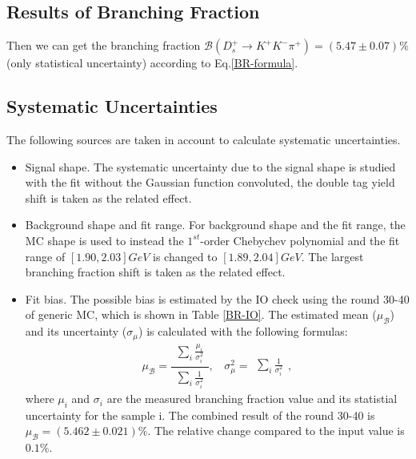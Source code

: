 {    \subsection{Results of Branching Fraction}



    Then we can get the branching fraction $\mathcal{B}(D_{s}^{+} \rightarrow K^{+}K^{-}\pi^{+})=(5.47\pm0.07)\%$(only statistical uncertainty) according to Eq.\ref{BR-formula}.

    \subsection{Systematic Uncertainties}
    The following sources are taken in account to calculate systematic uncertainties.

    \begin{itemize}
        \item Signal shape. The systematic uncertainty due to the signal shape is studied with the fit without the Gaussian function convoluted, the double tag yield shift is taken as the related effect. 

        \item Background shape and fit range. For background shape and the fit range, the MC shape is used to instead the $1^{st}$-order Chebychev polynomial and the fit range of $[1.90, 2.03]GeV$ is changed to $[1.89, 2.04]GeV$. 
            The largest branching fraction shift is taken as the related effect.
        
        \item Fit bias. The possible bias is estimated by the IO check using the round 30-40 of generic MC, which is shown in Table \ref{BR-IO}. 
            The estimated mean ($\mu_{\mathcal{B}}$) and its uncertainty ($\sigma_{\mu}$) is calculated with the following formulas:
            \begin{equation}
            \mu_{\mathcal{B}} = \frac{\begin{matrix}\sum_{i}\frac{\mu_{i}}{\sigma_{i}^{2}}\end{matrix}}{\begin{matrix}\sum_{i}\frac{1}{\sigma_{i}^{2}}\end{matrix}}, \ \ \ \ \sigma_{\mu}^{2}=\begin{matrix}\sum_{i}\frac{1}{\sigma_{i}^{2}}\end{matrix},
            \label{BR-Combined}
            \end{equation}
            where $\mu_{i}$ and $\sigma_{i}$ are the measured branching fraction value and its statistial uncertainty for the sample i. The combined result of the round 30-40 is $\mu_{\mathcal{B}} = (5.462 \pm 0.021)\%$. 
            The relative change compared to the input value is $0.1\%$.


\end{itemize}}
